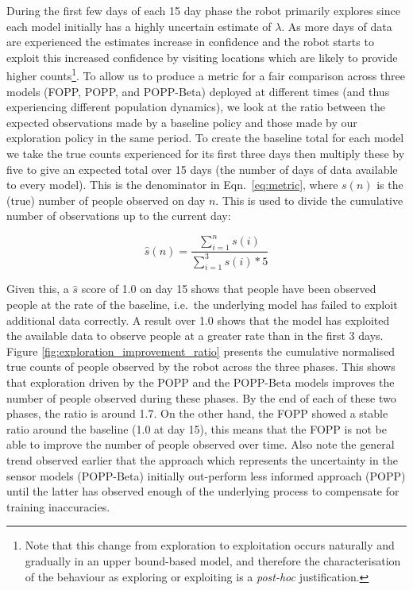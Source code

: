 
During the first few days of each 15 day phase the robot primarily explores since each model initially has a highly uncertain estimate of $\lambda$. As more days of data are experienced the estimates increase in confidence and the robot starts to exploit this increased confidence by visiting locations which are likely to provide higher counts\footnote{Note that this change from exploration to exploitation occurs naturally and gradually in an upper bound-based model, and therefore the characterisation of the behaviour as exploring or exploiting is a \emph{post-hoc} justification.}.
% 
To allow us to produce a metric for a fair comparison across three models (FOPP, POPP, and POPP-Beta) deployed at different times (and thus experiencing different population dynamics), we look at the ratio between the expected observations made by a baseline policy and those made by our exploration policy in the same period. 
% 
To create the baseline total for each model we take the true counts experienced for its first three days then multiply these by five to give an expected total over 15 days (the number of days of data available to every model). This is the denominator in Eqn.~\ref{eq:metric}, where $s(n)$ is the (true) number of people observed on day $n$. This is used to divide the cumulative number of observations up to the current day:

\begin{equation}
	\label{eq:metric}
\hat{s}(n) = \frac{\displaystyle\sum_{i=1}^{n} s(i)}{\displaystyle\sum_{i=1}^{3} s(i) * 5}
\end{equation}

\noindent Given this, a $\hat{s}$ score of 1.0 on day 15 shows that people have been observed people at the rate of the baseline, i.e.\ the underlying model has failed to exploit additional data correctly. A result over 1.0 shows that the model has exploited the available data to observe people at a greater rate than in the first 3 days. 
% 
Figure \ref{fig:exploration_improvement_ratio} presents the cumulative normalised true counts of people observed by the robot across the three phases. This shows that exploration driven by the POPP and the POPP-Beta models improves the number of people observed during these phases. By the end of each of these two phases, the ratio is around 1.7. On the other hand, the FOPP showed a stable ratio around the baseline (1.0 at day 15), this means that the FOPP is not be able to improve the number of people observed over time. 
% 
Also note the general trend observed earlier that the approach which represents the uncertainty in the sensor models (POPP-Beta) initially out-perform less informed approach (POPP) until the latter has observed enough of the underlying process to compensate for training inaccuracies. 

